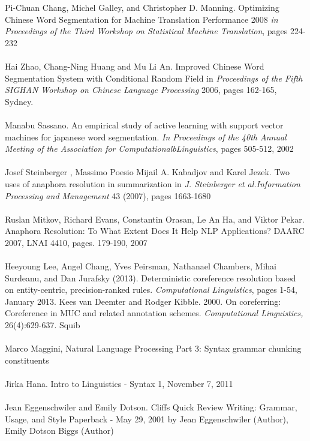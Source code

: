 \big[18\big] Pi-Chuan Chang, Michel Galley, and Christopher D. Manning. Optimizing Chinese Word Segmentation for Machine Translation Performance 2008  \emph{in Proceedings of the Third Workshop on Statistical Machine Translation}, pages 224-232 \\  \\
\big[19\big] Hai Zhao, Chang-Ning Huang and Mu Li An. Improved Chinese Word Segmentation System with Conditional Random Field  in \emph{Proceedings of the Fifth SIGHAN Workshop on Chinese Language Processing} 2006, pages 162-165, Sydney.\\ \\
\big[20\big] Manabu Sassano. An empirical study of active learning with support vector machines for japanese word segmentation. \emph{In Proceedings of the 40th Annual Meeting of the Association for ComputationalbLinguistics}, pages 505-512, 2002 \\ \\
\big[21\big] Josef Steinberger , Massimo Poesio Mijail A. Kabadjov and  Karel Jezek. Two uses of anaphora resolution in summarization in \emph{ J. Steinberger et al.Information Processing and Management} 43 (2007), pages 1663-1680 \\  \\
\big[22\big] Ruslan Mitkov, Richard Evans, Constantin Orasan, Le An Ha, and Viktor Pekar. Anaphora Resolution: To What Extent Does It Help NLP Applications?  DAARC 2007, LNAI 4410, pages. 179-190, 2007\\  \\
\big[23\big] Heeyoung Lee, Angel Chang, Yves Peirsman, Nathanael Chambers, Mihai Surdeanu, and Dan Jurafsky (2013). Deterministic coreference resolution based on entity-centric, precision-ranked rules. \emph{Computational Linguistics}, pages 1-54, January 2013. 
\big[24\big] Kees van Deemter and Rodger Kibble. 2000. On coreferring: Coreference in MUC and related annotation schemes. \emph{Computational Linguistics,} 26(4):629-637. Squib \\  \\
\big[25\big] Marco Maggini, Natural Language Processing Part 3: Syntax  grammar chunking  constituents   \\  \\
\big[26\big] Jirka Hana. Intro to Linguistics - Syntax 1, November 7, 2011 \\  \\
\big[27\big] Jean Eggenschwiler and Emily Dotson. Cliffs Quick Review Writing: Grammar, Usage, and Style Paperback - May 29, 2001 by Jean Eggenschwiler  (Author), Emily Dotson Biggs (Author) \\  \\
